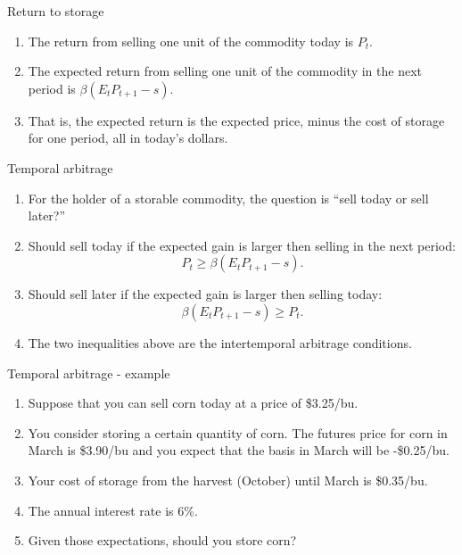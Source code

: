 \documentclass[table,xcolor=pdftex,dvipsnames, handout]{beamer}\usepackage[]{graphicx}\usepackage[]{color}
\begin{document}

\begin{frame}{Return to storage}
\begin{enumerate}[label=\textbullet]
    \item The return from selling one unit of the commodity today is $P_t$.
    \item The expected return from selling one unit of the commodity in the next period is $\beta (E_t P_{t+1} - s)$.
    \item That is, the expected return is the expected price, minus the cost of storage for one period, all in today's dollars.
\end{enumerate}
\end{frame}



\begin{frame}{Temporal arbitrage}
\begin{enumerate}[label=\textbullet]
    \item For the holder of a storable commodity, the question is ``sell today or sell later?''
    \item Should sell today if the expected gain is larger then selling in the next period: \[ P_t \ge \beta (E_t P_{t+1} - s). \]
    \vspace{-1\baselineskip}
    \item Should sell later if the expected gain is larger then selling today: \[ \beta (E_t P_{t+1} - s) \ge P_t. \]
    \vspace{-1\baselineskip}
    \item The two inequalities above are the intertemporal arbitrage conditions.
\end{enumerate}
\end{frame}



\begin{frame}{Temporal arbitrage - example}
\begin{enumerate}[label=\textbullet]
    \item Suppose that you can sell corn today at a price of \$3.25/bu.
    \item You consider storing a certain quantity of corn. The futures price for corn in March is \$3.90/bu and you expect that the basis in March will be -\$0.25/bu.
    \item Your cost of storage from the harvest (October) until March is \$0.35/bu.
    \item The annual interest rate is 6\%.
    \item Given those expectations, should you store corn?
\end{enumerate}
\end{frame}
\end{document}
